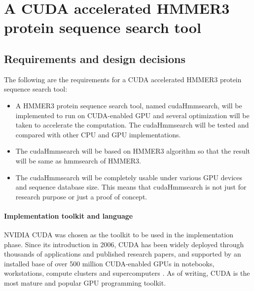 
\chapter{A CUDA accelerated HMMER3 protein sequence search tool} %

\label{CUDAHMMER3} %



\section{Requirements and design decisions}

The following are the requirements for a CUDA accelerated HMMER3 protein sequence search tool:

\begin{itemize}
\item A HMMER3 protein sequence search tool, named cudaHmmsearch, will be implemented to run on CUDA-enabled GPU and several optimization will be taken to accelerate the computation. The cudaHmmsearch will be tested and compared with other CPU and GPU implementations.
\item The cudaHmmsearch will be based on HMMER3 algorithm so that the result will be same as hmmsearch of HMMER3.
\item The cudaHmmsearch will be completely usable under various GPU devices and sequence database size. This means that cudaHmmsearch is not just for research purpose or just a proof of concept.
\end{itemize}

\subsubsection*{Implementation toolkit and language}

NVIDIA CUDA \citep{CUDAzone} was chosen as the toolkit to be used in the implementation phase. Since its introduction in 2006, CUDA has been widely deployed through thousands of applications and published research papers, and supported by an installed base of over 500 million CUDA-enabled GPUs in notebooks, workstations, compute clusters and supercomputers \citep{CUDAwhat}. As of writing, CUDA is the most mature and popular GPU programming toolkit. 

